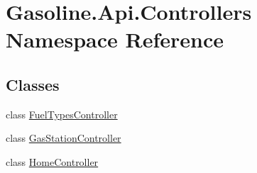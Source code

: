 \hypertarget{namespace_gasoline_1_1_api_1_1_controllers}{}\section{Gasoline.\+Api.\+Controllers Namespace Reference}
\label{namespace_gasoline_1_1_api_1_1_controllers}
\subsection*{Classes}
\begin{DoxyCompactItemize}
\item 
class \mbox{\hyperlink{class_gasoline_1_1_api_1_1_controllers_1_1_fuel_types_controller}{Fuel\+Types\+Controller}}
\item 
class \mbox{\hyperlink{class_gasoline_1_1_api_1_1_controllers_1_1_gas_station_controller}{Gas\+Station\+Controller}}
\item 
class \mbox{\hyperlink{class_gasoline_1_1_api_1_1_controllers_1_1_home_controller}{Home\+Controller}}
\end{DoxyCompactItemize}
